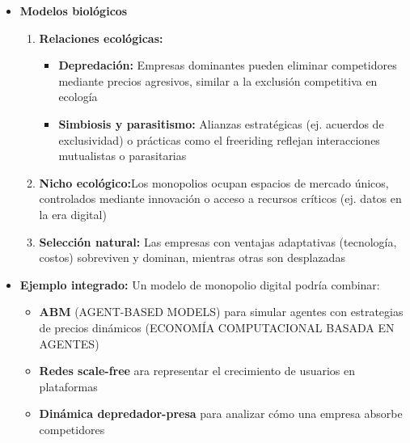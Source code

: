 \documentclass[a4paper,12pt]{article}
\begin{document}
\begin{itemize}
\begin{itemize}
\begin{itemize}
\begin{itemize}
    \item \textbf{Estructuras scale-free:} La concentración de nodos centrales (empresas dominantes) explica la distribución de poder en mercados digitales

    \item \textbf{Interdependencia: } Las redes de proveedores, consumidores y reguladores forman sistemas interconectados donde cambios locales afectan globalmente el sistema.	
		\end{itemize}
		
	\item \textbf{Modelos biológicos}
		\begin{enumerate}
    \item \textbf{Relaciones ecológicas:} 		
			\begin{itemize}
    \item \textbf{Depredación:} Empresas dominantes pueden eliminar competidores mediante precios agresivos, similar a la exclusión competitiva en ecología
        \item \textbf{Simbiosis y parasitismo:} Alianzas estratégicas (ej. acuerdos de exclusividad) o prácticas como el freeriding reflejan interacciones mutualistas o parasitarias
\end{itemize}			    
    \item \textbf{Nicho ecológico:}Los monopolios ocupan espacios de mercado únicos, controlados mediante innovación o acceso a recursos críticos (ej. datos en la era digital) 		
    \item \textbf{Selección natural: } Las empresas con ventajas adaptativas (tecnología, costos) sobreviven y dominan, mientras otras son desplazadas
		\end{enumerate}

    

    \item \textbf{Ejemplo integrado: } Un modelo de monopolio digital podría combinar:
    \begin{itemize}
    \item \textbf{ABM} (AGENT-BASED MODELS) para simular agentes con estrategias de precios dinámicos (ECONOMÍA COMPUTACIONAL BASADA EN AGENTES)
        \item \textbf{Redes scale-free} ara representar el crecimiento de usuarios en plataformas    
                \item \textbf{Dinámica depredador-presa} para analizar cómo una empresa absorbe competidores    
    \end{itemize}			
\end{itemize}


\end{itemize}
\end{itemize}
\end{document}
